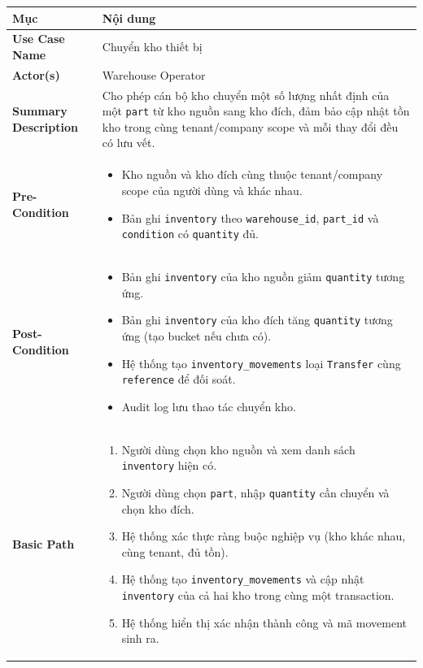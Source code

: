\begin{xltabular}{\textwidth}{|>{\bfseries}p{4.5cm}|X|}
    \hline
    \textbf{Mục} & \textbf{Nội dung} \\
    \hline
    Use Case Name & Chuyển kho thiết bị \\
    \hline
    Actor(s) & Warehouse Operator \\
    \hline
    Summary Description & Cho phép cán bộ kho chuyển một số lượng nhất định của một \texttt{part} từ kho nguồn sang kho đích, đảm bảo cập nhật tồn kho trong cùng tenant/company scope và mỗi thay đổi đều có lưu vết. \\
    \hline
    Pre-Condition &
    \begin{itemize}[leftmargin=*, nosep]
        \item Kho nguồn và kho đích cùng thuộc tenant/company scope của người dùng và khác nhau.
        \item Bản ghi \texttt{inventory} theo \texttt{warehouse\_id}, \texttt{part\_id} và \texttt{condition} có \texttt{quantity} đủ.
    \end{itemize} \\
    \hline
    Post-Condition &
    \begin{itemize}[leftmargin=*, nosep]
        \item Bản ghi \texttt{inventory} của kho nguồn giảm \texttt{quantity} tương ứng.
        \item Bản ghi \texttt{inventory} của kho đích tăng \texttt{quantity} tương ứng (tạo bucket nếu chưa có).
        \item Hệ thống tạo \texttt{inventory\_movements} loại \texttt{Transfer} cùng \texttt{reference} để đối soát.
        \item Audit log lưu thao tác chuyển kho.
    \end{itemize} \\
    \hline
    Basic Path &
    \begin{enumerate}[leftmargin=*, nosep]
        \item Người dùng chọn kho nguồn và xem danh sách \texttt{inventory} hiện có.
        \item Người dùng chọn \texttt{part}, nhập \texttt{quantity} cần chuyển và chọn kho đích.
        \item Hệ thống xác thực ràng buộc nghiệp vụ (kho khác nhau, cùng tenant, đủ tồn).
        \item Hệ thống tạo \texttt{inventory\_movements} và cập nhật \texttt{inventory} của cả hai kho trong cùng một transaction.
        \item Hệ thống hiển thị xác nhận thành công và mã movement sinh ra.

\end{enumerate}
\end{xltabular}
